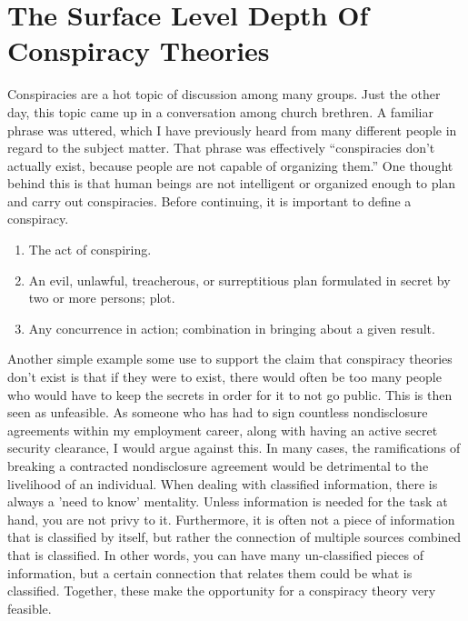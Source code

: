 \documentclass[10pt, a4paper, twocolumn]{book}
\begin{document}
\sectionEnd


\section{The Surface Level Depth Of Conspiracy Theories}

Conspiracies are a hot topic of discussion among many groups. Just the other day, this topic came up in a conversation among church brethren. A familiar phrase was uttered, which I have previously heard from many different people in regard to the subject matter. That phrase was effectively ``conspiracies don't actually exist, because people are not capable of organizing them.'' One thought behind this is that human beings are not intelligent or organized enough to plan and carry out conspiracies. Before continuing, it is important to define a conspiracy. 

\begin{fancybox}{}
	\begin{enumerate}
		\item The act of conspiring.
		\item An evil, unlawful, treacherous, or surreptitious plan formulated in secret by two or more persons; plot.
		\item Any concurrence in action; combination in bringing about a given result.
	\end{enumerate}
\end{fancybox}

Another simple example some use to support the claim that conspiracy theories don't exist is that if they were to exist, there would often be too many people who would have to keep the secrets in order for it to not go public. This is then seen as unfeasible. As someone who has had to sign countless nondisclosure agreements within my employment career, along with having an active secret security clearance, I would argue against this. In many cases, the ramifications of breaking a contracted nondisclosure agreement would be detrimental to the livelihood of an individual. When dealing with classified information, there is always a 'need to know' mentality. Unless information is needed for the task at hand, you are not privy to it. Furthermore, it is often not a piece of information that is classified by itself, but rather the connection of multiple sources combined that is classified. In other words, you can have many un-classified pieces of information, but a certain connection that relates them could be what is classified. Together, these make the opportunity for a conspiracy theory very feasible.
\end{document}

